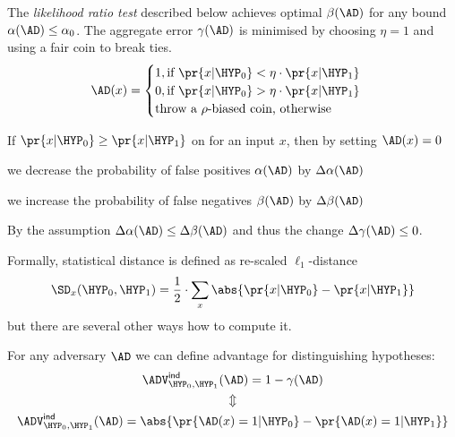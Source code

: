 \documentclass[landscape,footrule]{foils}
\newcommand{\lastline}{\vspace*{-2ex}}
\begin{document}

The \emph{likelihood ratio test} described below achieves optimal
$\beta(\AD)$ for any bound $\alpha(\AD)\leq\alpha_0$. The aggregate
error $\gamma(\AD)$ is minimised by choosing $\eta=1$ and using a fair
coin to break ties.
\begin{align*}
  \AD(x)=
  \begin{cases}
    1,\text{if }\pr{x|\HYP_0}<\eta\cdot\pr{x|\HYP_1}\\
    0,\text{if }\pr{x|\HYP_0}>\eta\cdot \pr{x|\HYP_1}\\
    \text{throw a $\rho$-biased coin, otherwise} \\
  \end{cases}
\end{align*}



If $\pr{x|\HYP_0}\geq \pr{x|\HYP_1}$ on for an input $x$, then by setting $\AD(x)=0$  
\begin{triangles}
 \item we decrease the probability of false positives $\alpha(\AD)$ by $\Delta \alpha(\AD)$
 \item we increase the probability of false negatives $\beta(\AD)$ by $\Delta \beta(\AD)$
\end{triangles}
By the assumption $\Delta\alpha(\AD)\leq \Delta \beta(\AD)$ and thus the change $\Delta\gamma(\AD)\leq 0$.
\lastline




Formally, statistical distance is defined as re-scaled $\ell_1$-distance
\begin{align*}
  \SD_x(\HYP_0,\HYP_1)=\frac{1}{2}\cdot \sum_{x}\abs{\pr{x|\HYP_0}-\pr{x|\HYP_1}}
\end{align*}
but there are several other ways how to compute it.\lastline



For any adversary $\AD$ we can define advantage for distinguishing hypotheses:
\begin{gather*}
  \advINDXX{\HYP_0,\HYP_1}{\AD}= 1-\gamma(\AD)\\
    \Updownarrow\\
   \advINDXX{\HYP_0,\HYP_1}{\AD}=\abs{ \pr{\AD(x)=1|\HYP_0}-\pr{\AD(x)=1|\HYP_1}}
\end{gather*}
\end{document}
